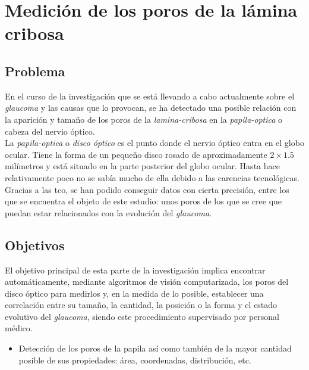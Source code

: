 \chapter{Medición de los poros de la lámina cribosa}
\section{Problema}
En el curso de la investigación que se está llevando a cabo
actualmente sobre el \emph{\gls{glaucoma}} y las causas que lo
provocan, se ha detectado una posible relación con la aparición y
tamaño de los poros de la \emph{\gls{lamina-cribosa}} en la
\emph{\gls{papila-optica}} o cabeza del nervio óptico. \\
La \emph{\gls{papila-optica}} o \emph{disco óptico} es el punto donde
el nervio óptico entra en el globo ocular. Tiene la forma de un
pequeño disco rosado de aproximadamente $2 \times 1.5$ milímetros y
está situado en la parte posterior del globo ocular. Hasta hace
relativamente poco no se sabía mucho de ella debido a las carencias
tecnológicas. Gracias a las \gls{tco}, se han podido conseguir datos
con cierta precisión, entre los que se encuentra el objeto de este
estudio: unos poros de los que se cree que puedan estar
relacionados con la evolución del \emph{\gls{glaucoma}}.

\section{Objetivos}
El objetivo principal de esta parte de la investigación implica
encontrar automáticamente, mediante algoritmos de visión
computarizada, los poros del disco óptico para medirlos y, en la
medida de lo posible, establecer una correlación entre su tamaño, la
cantidad, la posición o la forma y el estado evolutivo del
\emph{\gls{glaucoma}}, siendo este procedimiento supervisado por
personal médico.
\begin{itemize}
\item Detección de los poros de la papila así como también de la mayor
  cantidad posible de sus propiedades: área, coordenadas,
  distribución, etc.
\end{itemize}

